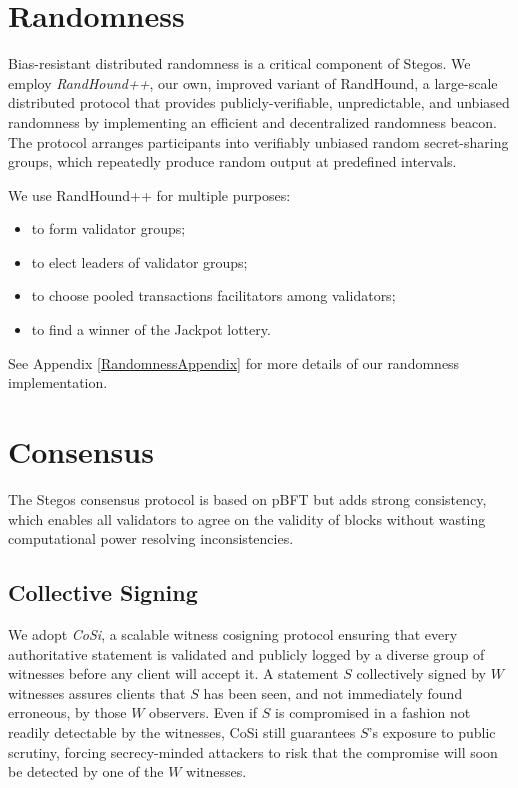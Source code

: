 \documentclass[a4paper, 10pt, conference]{ieeeconf}
\begin{document}
\section{Randomness}\label{Randomness} 

Bias-resistant distributed randomness is a critical component of Stegos. We employ \textit{RandHound++}, our own, improved variant of RandHound\cite{c12}, a large-scale distributed protocol that provides publicly-verifiable, unpredictable, and unbiased randomness by implementing an efficient and decentralized randomness beacon. The protocol arranges participants into verifiably unbiased random secret-sharing groups, which repeatedly produce random output at predefined intervals. 

We use RandHound++ for multiple purposes:

\begin{itemize}
	\item {to form validator groups;}
	\item {to elect leaders of validator groups;} 
	\item {to choose pooled transactions facilitators among validators;}
	\item {to find a winner of the Jackpot lottery.}
\end{itemize}

See Appendix \ref{RandomnessAppendix} for more details of our randomness implementation. 

\section{Consensus}\label{Consensus}

The Stegos consensus protocol is based on pBFT\cite{c9} but adds strong consistency, which enables all validators to agree on the validity of blocks without wasting computational power resolving inconsistencies. 

\subsection{Collective Signing}
We adopt \textit{CoSi}\cite{c10}\cite{c11}, a scalable witness cosigning protocol ensuring that every authoritative statement is validated and publicly logged by a diverse group of witnesses before any client will accept it. A statement $S$ collectively signed by $W$ witnesses assures clients that $S$ has been seen, and not immediately found erroneous, by those $W$ observers. Even if $S$ is compromised in a fashion not readily detectable by the witnesses, CoSi still guarantees $S$’s exposure to public scrutiny, forcing secrecy-minded attackers to risk that the compromise will soon be detected by one of the $W$ witnesses. 
\end{document}
